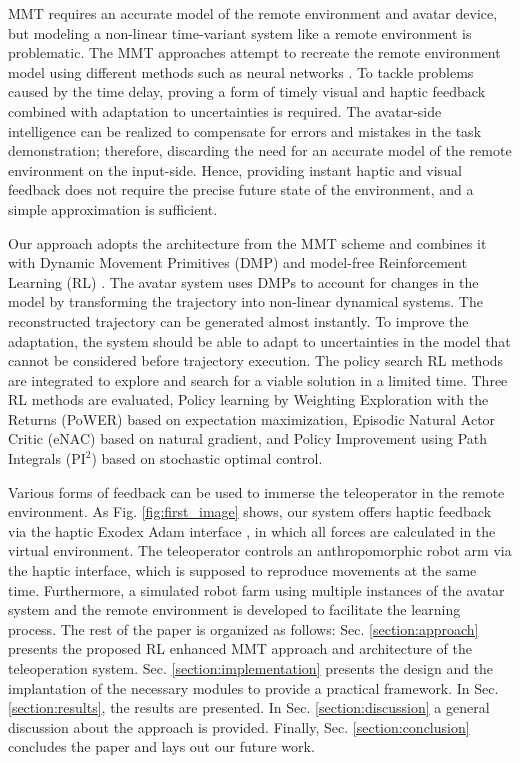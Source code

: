 \documentclass[letterpaper, 10 pt, conference]{ieeeconf}  %
\begin{document}
\noindent
MMT requires an accurate model of the remote environment and avatar device, but modeling a non-linear time-variant system like a remote environment is problematic. 
 The MMT approaches attempt to recreate the remote environment model using different methods such as neural networks \cite{iet:/content/books/ce/pbce037e}.
To tackle problems caused by the time delay, proving a form of timely visual and haptic feedback combined with adaptation to uncertainties is required.
The avatar-side intelligence can be realized to compensate for errors and mistakes in the task demonstration; therefore, discarding the need for an accurate model of the remote environment on the input-side. Hence, providing instant haptic and visual feedback does not require the precise future state of the environment, and a simple approximation is sufficient. 

\noindent
Our approach adopts the architecture from the MMT scheme and combines it with Dynamic Movement Primitives (DMP) \cite{MainDMP} and model-free Reinforcement Learning (RL) \cite{MainPI2, freekpi2, PowerAlgorithm}. The avatar system uses DMPs to account for changes in the model by transforming the trajectory into non-linear dynamical systems. The reconstructed trajectory can be generated almost instantly. To improve the adaptation, the system should be able to adapt to uncertainties in the model that cannot be considered before trajectory execution. The policy search RL methods are integrated to explore and search for a viable solution in a limited time. Three RL methods are evaluated, Policy learning by Weighting Exploration with the Returns (PoWER) \cite{PowerAlgorithm} based on expectation maximization, Episodic Natural Actor Critic (eNAC) \cite{enac} based on natural gradient, and Policy Improvement using Path Integrals ($\textrm{PI}^2$) \cite{MainPI2} based on stochastic optimal control. 

\noindent
Various forms of feedback can be used to immerse the teleoperator in the remote environment. As Fig. \ref{fig:first_image} shows, our system offers haptic feedback via the haptic Exodex Adam interface \cite{p:Exodex-Prime,p:Exodex-Adam}, in which all forces are calculated in the virtual environment. The teleoperator controls an anthropomorphic robot arm via the haptic interface, which is supposed to reproduce movements at the same time. Furthermore, a simulated robot farm using multiple instances of the avatar system and the remote environment is developed to facilitate the learning process. 
\noindent
The rest of the paper is organized as follows: Sec. \ref{section:approach} presents the proposed RL enhanced MMT approach and architecture of the teleoperation system. Sec. \ref{section:implementation} presents the design and the implantation of the necessary modules to provide a practical framework. In Sec. \ref{section:results}, the results are presented. In Sec. \ref{section:discussion} a general discussion about the approach is provided. Finally, Sec. \ref{section:conclusion} concludes the paper and lays out our future work.
\end{document}
